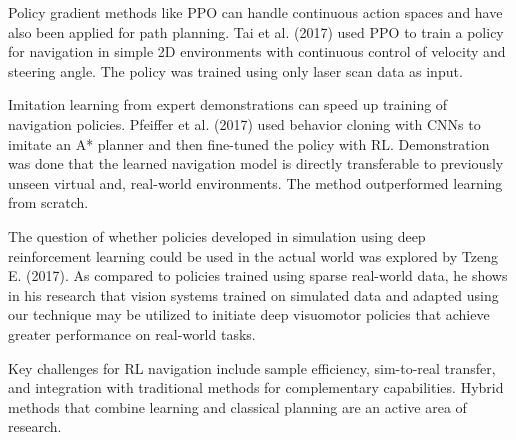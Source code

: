 \documentclass[conference]{IEEEtran}
\begin{document}
    
    Policy gradient methods like PPO can handle continuous action spaces and have also been applied for path planning. Tai et al. (2017)\cite{tai2017virtual} used PPO to train a policy for navigation in simple 2D environments with continuous control of velocity and steering angle. The policy was trained using only laser scan data as input.\par  

    
    Imitation learning from expert demonstrations can speed up training of navigation policies. Pfeiffer et al. (2017)\cite{pfeiffer2017perception} used behavior cloning with CNNs to imitate an A* planner and then fine-tuned the policy with RL. Demonstration was done that the learned navigation model is directly transferable to previously unseen virtual and, real-world environments. The method outperformed learning from scratch.\par 

    The question of whether policies developed in simulation using deep reinforcement learning could be used in the actual world was explored by Tzeng E. (2017)\cite{tzeng2017adapting}. As compared to policies trained using sparse real-world data, he shows in his research that vision systems trained on simulated data and adapted using our technique may be utilized to initiate deep visuomotor policies that achieve greater performance on real-world tasks.\par  

    
    Key challenges for RL navigation include sample efficiency, sim-to-real transfer, and integration with traditional methods for complementary capabilities. Hybrid methods that combine learning and classical planning are an active area of research.\par





\end{document}
